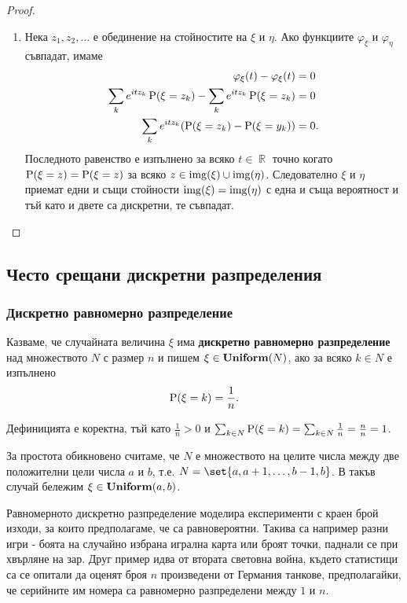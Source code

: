 \documentclass{../../common/topic}
\begin{document}
\begin{proof}
\begin{enumerate}
    \item Нека \( z_1, z_2, \ldots \) е обединение на стойностите на \( \xi \) и \( \eta \). Ако функциите \( \varphi_\xi \) и \( \varphi_\eta \) съвпадат, имаме
    \begin{align*}
      \varphi_\xi(t) - \varphi_\xi(t) &= 0
      \\
      \sum_k e^{i t z_k} \operatorname{P}(\xi = z_k) - \sum_k e^{i t z_k} \operatorname{P}(\xi = z_k) &= 0
      \\
      \sum_k e^{i t z_k} (\operatorname{P}(\xi = z_k) - \operatorname{P}(\xi = y_k)) &= 0.
    \end{align*}
    Последното равенство е изпълнено за всяко \( t \in \BbbR \) точно когато \( \operatorname{P}(\xi = z) = \operatorname{P}(\xi = z) \) за всяко \( z \in \operatorname{img}(\xi) \cup \operatorname{img}(\eta) \). Следователно \( \xi \) и \( \eta \) приемат едни и същи стойности \( \operatorname{img}(\xi) = \operatorname{img}(\eta) \) с една и съща вероятност и тъй като и двете са дискретни, те съвпадат.
  \end{enumerate}
\end{proof}

\subsection{Често срещани дискретни разпределения}

\subsubsection{Дискретно равномерно разпределение}\label{sec:unif}

\begin{definition}
  Казваме, че случайната величина \( \xi \) има \textbf{дискретно равномерно разпределение} над множеството \( N \) с размер \( n \) и пишем \( \xi \in \operatorname{\mathbf{Uniform}}(N) \), ако за всяко \( k \in N \) е изпълнено
  \begin{equation*}
    \operatorname{P}(\xi = k) = \frac 1 n.
  \end{equation*}

  Дефиницията е коректна, тъй като \( \frac 1 n > 0 \) и \( \sum_{k \in N} \operatorname{P}(\xi = k) = \sum_{k \in N} \frac 1 n = \frac n n = 1 \).

  За простота обикновено считаме, че \( N \) е множеството на целите числа между две положителни цели числа \( a \) и \( b \), т.е. \( N = \set{ a, a + 1, \ldots, b - 1, b } \). В такъв случай бележим \( \xi \in \operatorname{\mathbf{Uniform}}(a, b) \).
\end{definition}

Равномерното дискретно разпределение моделира експерименти с краен брой изходи, за които предполагаме, че са равновероятни. Такива са например разни игри - боята на случайно избрана игрална карта или броят точки, паднали се при хвърляне на зар. Друг пример идва от втората световна война, където статистици са се опитали да оценят броя \( n \) произведени от Германия танкове, предполагайки, че серийните им номера са равномерно разпределени между \( 1 \) и \( n \).
\end{document}
